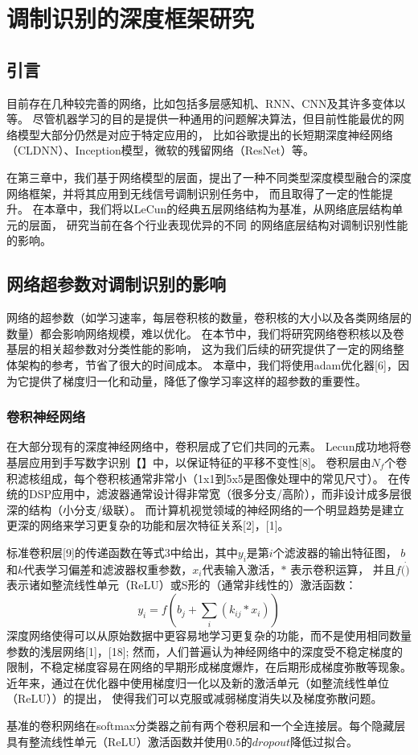 \chapter{调制识别的深度框架研究}

\section{引言}
目前存在几种较完善的网络，比如包括多层感知机、RNN、CNN及其许多变体以等。
尽管机器学习的目的是提供一种通用的问题解决算法，但目前性能最优的网络模型大部分仍然是对应于特定应用的，
比如谷歌提出的长短期深度神经网络（CLDNN）、Inception模型，微软的残留网络（ResNet）等。 \par
在第三章中，我们基于网络模型的层面，提出了一种不同类型深度模型融合的深度网络框架，并将其应用到无线信号调制识别任务中，
而且取得了一定的性能提升。
在本章中，我们将以LeCun的经典五层网络结构为基准，从网络底层结构单元的层面，
研究当前在各个行业表现优异的不同
的网络底层结构对调制识别性能的影响。\par

\section{网络超参数对调制识别的影响}
网络的超参数（如学习速率，每层卷积核的数量，卷积核的大小以及各类网络层的数量）都会影响网络规模，难以优化。
在本节中，我们将研究网络卷积核以及卷基层的相关超参数对分类性能的影响，
这为我们后续的研究提供了一定的网络整体架构的参考，节省了很大的时间成本。
本章中，我们将使用adam优化器[6]，因为它提供了梯度归一化和动量，降低了像学习率这样的超参数的重要性。

\subsection{卷积神经网络}
在大部分现有的深度神经网络中，卷积层成了它们共同的元素。
Lecun成功地将卷基层应用到手写数字识别【】中，以保证特征的平移不变性[8]。
卷积层由$N_f$个卷积滤核组成，每个卷积核通常非常小（1x1到5x5是图像处理中的常见尺寸）。
在传统的DSP应用中，滤波器通常设计得非常宽（很多分支/高阶），而非设计成多层很深的结构（小分支/级联）。
而计算机视觉领域的神经网络的一个明显趋势是建立更深的网络来学习更复杂的功能和层次特征关系[2]，[1]。\par
标准卷积层[9]的传递函数在等式3中给出，其中$y_i$是第$i$个滤波器的输出特征图，
$b$和$k$代表学习偏差和滤波器权重参数，$x_i$代表输入激活，$*$ 表示卷积运算，
并且$f(\dot)$表示诸如整流线性单元（ReLU）或S形的（通常非线性的）激活函数：
\begin{equation}
	y_i = f (b_j + \sum_{i}(k_{ij} * x_i))
\end{equation}
深度网络使得可以从原始数据中更容易地学习更复杂的功能，而不是使用相同数量参数的浅层网络[1]，[18];
然而，人们普遍认为神经网络中的深度受不稳定梯度的限制，不稳定梯度容易在网络的早期形成梯度爆炸，在后期形成梯度弥散等现象。
近年来，通过在优化器中使用梯度归一化以及新的激活单元（如整流线性单位（ReLU））的提出，
使得我们可以克服或减弱梯度消失以及梯度弥散问题。\par
基准的卷积网络在softmax分类器之前有两个卷积层和一个全连接层。每个隐藏层具有整流线性单元（ReLU）激活函数并使用0.5的$dropout$降低过拟合。\par

